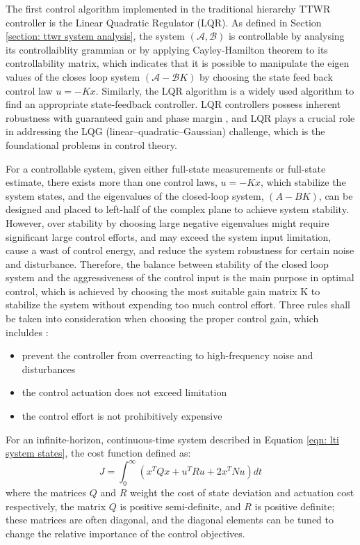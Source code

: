 The first control algorithm implemented in the traditional hierarchy TTWR controller is the Linear Quadratic Regulator (LQR). As defined in Section \ref{section: ttwr system analysis}, the system $(\mathcal{A}, \mathcal{B})$ is controllable by analysing its controllaiblity grammian or by applying Cayley-Hamilton theorem to its controllability matrix, which indicates that it is possible to manipulate the eigen values of the closes loop system $(\mathcal{A} - \mathcal{B}K)$ by choosing the state feed back control law $u = -K x$. Similarly, the LQR algorithm is a widely used algorithm to find an appropriate state-feedback controller. LQR controllers possess inherent robustness with guaranteed gain and phase margin \parencite{lehtomaki1981robustness}, and LQR plays a crucial role in addressing the LQG (linear–quadratic–Gaussian) challenge, which is the foundational problems in control theory.

For a controllable system, given either full-state measurements or full-state estimate, there exists more than one control laws, $u = - K x$, which stabilize the system states, and the eigenvalues of the closed-loop system, $(A - B K)$, can be designed and placed to left-half of the complex plane to achieve system stability. However, over stability by choosing large negative eigenvalues might require significant large control efforts, and may exceed the system input limitation, cause a wast of control energy, and reduce the system robustness for certain noise and disturbance. Therefore, the balance between stability of the closed loop system and the aggressiveness of the control input is the main purpose in optimal control, which is achieved by choosing the most suitable gain matrix K to stabilize the system without expending too much control effort. Three rules shall be taken into consideration when choosing the proper control gain, which incluldes \parencite{brunton2022data}:

\begin{itemize}
    \item prevent the controller from overreacting to high-frequency noise and disturbances
    \item the control actuation does not exceed limitation
    \item the control effort is not prohibitively expensive
\end{itemize}

For an infinite-horizon, continuous-time system described in Equation \ref{eqn: lti system states}, the cost function defined as:
\begin{equation}
    J=\int_0^{\infty}\left(x^T Q x+u^T R u+2 x^T N u\right) d t
    \label{eqn: lqr control cost function}
\end{equation}
where the matrices $Q$ and $R$ weight the cost of state deviation and actuation cost respectively, the matrix $Q$ is positive semi-definite, and $R$ is positive definite; these matrices are often diagonal, and the diagonal elements can be tuned to change the relative importance of the control objectives.

